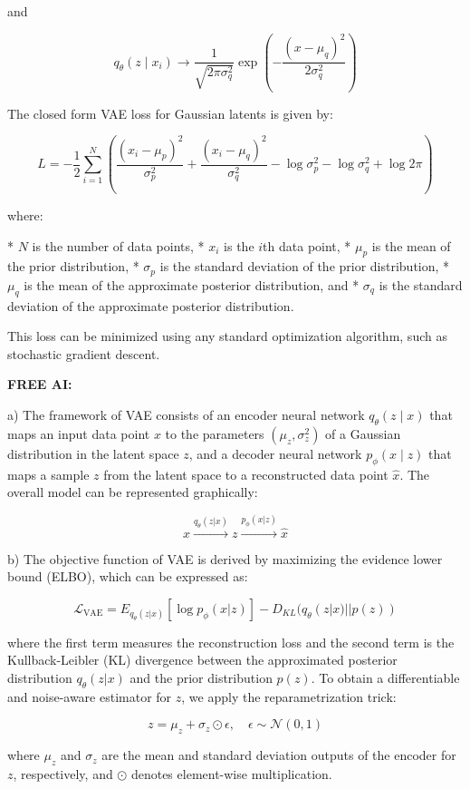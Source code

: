 \documentclass{homework}
\begin{document}
and

$$
q_{\theta}\left(z \mid x_{i}\right) \rightarrow \frac{1}{\sqrt{2 \pi \sigma_{q}^{2}}} \exp \left(-\frac{\left(x-\mu_{q}\right)^{2}}{2 \sigma_{q}^{2}}\right)
$$

The closed form VAE loss for Gaussian latents is given by:

$$
L = -\frac{1}{2} \sum_{i=1}^{N} \left( \frac{(x_{i} - \mu_{p})^{2}}{\sigma_{p}^{2}} + \frac{(x_{i} - \mu_{q})^{2}}{\sigma_{q}^{2}} - \log \sigma_{p}^{2} - \log \sigma_{q}^{2} + \log 2 \pi \right)
$$

where:

* $N$ is the number of data points,
* $x_{i}$ is the $i$th data point,
* $\mu_{p}$ is the mean of the prior distribution,
* $\sigma_{p}$ is the standard deviation of the prior distribution,
* $\mu_{q}$ is the mean of the approximate posterior distribution, and
* $\sigma_{q}$ is the standard deviation of the approximate posterior distribution.

This loss can be minimized using any standard optimization algorithm, such as stochastic gradient descent.

\textbf{FREE AI:}

a) The framework of VAE consists of an encoder neural network $q_{\theta}(z \mid x)$ that maps an input data point $x$ to the parameters $(\mu_z, \sigma_z^2)$ of a Gaussian distribution in the latent space $z$, and a decoder neural network $p_{\phi}(x \mid z)$ that maps a sample $z$ from the latent space to a reconstructed data point $\hat{x}$. The overall model can be represented graphically:

$$
x \overset{q_\theta(z|x)}{\rightarrow} z \overset{p_\phi(x|z)}{\rightarrow} \hat{x}
$$

b) The objective function of VAE is derived by maximizing the evidence lower bound (ELBO), which can be expressed as:

$$
\mathcal{L}_{\text{VAE}} = E_{q_\theta(z|x)}[\log p_\phi(x|z)] - D_{KL}(q_\theta(z|x)||p(z))
$$

where the first term measures the reconstruction loss and the second term is the Kullback-Leibler (KL) divergence between the approximated posterior distribution $q_\theta(z|x)$ and the prior distribution $p(z)$. To obtain a differentiable and noise-aware estimator for $z$, we apply the reparametrization trick:

$$
z = \mu_z + \sigma_z\odot \epsilon, \quad \epsilon \sim \mathcal{N}(0,1)
$$

where $\mu_z$ and $\sigma_z$ are the mean and standard deviation outputs of the encoder for $z$, respectively, and $\odot$ denotes element-wise multiplication.
\end{document}
